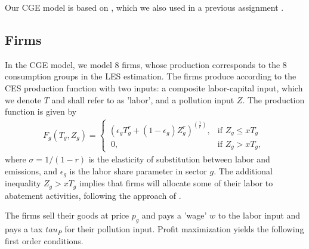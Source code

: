 
Our CGE model is based on \cite{klenert2018}, which we also used in a previous assignment \cite{ourselves2020}.  

\subsection{Firms}  
In the CGE model, we model 8 firms, whose production corresponds to the 8 consumption groups in the LES estimation. The firms produce according to the CES production function with two inputs: a composite labor-capital input, which we denote $T$ and shall refer to as 'labor', and a pollution input $Z$. The production function is given by
\begin{align}\label{eq:prodfunc}
F_g(T_g,Z_g)=\begin{cases} 
      (\epsilon_gT^r_g + (1-\epsilon_g)Z^r_g)^{(\frac{1}{r})}, & \textrm{if $Z_g \leq xT_g$ }\\\
      0, & \textrm{if $Z_g > xT_g$, }
   \end{cases}
\end{align}
where $\sigma=1/(1-r)$ is the elasticity of substitution between labor and emissions, and $\epsilon_g$ is  the labor share parameter in sector $g$. The additional inequality $Z_g > xT_g$ implies that firms will allocate some of their labor to abatement activities, following the approach of \cite{copelandandtaylor1994}. 

The firms sell their goods at price $p_g$ and pays a 'wage' $w$ to the labor input and pays a tax $tau_P$ for their pollution input. Profit maximization yields the following first order conditions.

